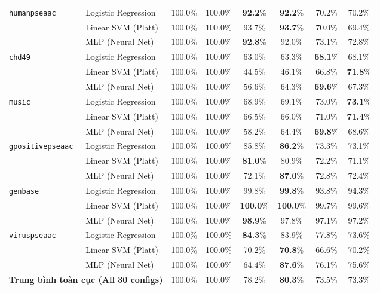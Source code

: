 \documentclass[10pt,a4paper,twoside]{article}
\begin{document}
\begin{table}[H]
{\begin{tabular}{llcccccc}
\midrule
\multirow{3}{*}{\texttt{humanpseaac}} & Logistic Regression & 100.0\% & 100.0\% & \textbf{92.2}\% & \textbf{92.2}\% & 70.2\% & 70.2\% \\
 & Linear SVM (Platt) & 100.0\% & 100.0\% & 93.7\% & \textbf{93.7}\% & 70.0\% & 69.4\% \\
 & MLP (Neural Net) & 100.0\% & 100.0\% & \textbf{92.8}\% & 92.0\% & 73.1\% & 72.8\% \\
\midrule
\multirow{3}{*}{\texttt{chd49}} & Logistic Regression & 100.0\% & 100.0\% & 63.0\% & 63.3\% & \textbf{68.1}\% & 68.1\% \\
 & Linear SVM (Platt) & 100.0\% & 100.0\% & 44.5\% & 46.1\% & 66.8\% & \textbf{71.8}\% \\
 & MLP (Neural Net) & 100.0\% & 100.0\% & 56.6\% & 64.3\% & \textbf{69.6}\% & 67.3\% \\
\midrule
\multirow{3}{*}{\texttt{music}} & Logistic Regression & 100.0\% & 100.0\% & 68.9\% & 69.1\% & 73.0\% & \textbf{73.1}\% \\
 & Linear SVM (Platt) & 100.0\% & 100.0\% & 66.5\% & 66.0\% & 71.0\% & \textbf{71.4}\% \\
 & MLP (Neural Net) & 100.0\% & 100.0\% & 58.2\% & 64.4\% & \textbf{69.8}\% & 68.6\% \\
\midrule
\multirow{3}{*}{\texttt{gpositivepseaac}} & Logistic Regression & 100.0\% & 100.0\% & 85.8\% & \textbf{86.2}\% & 73.3\% & 73.1\% \\
 & Linear SVM (Platt) & 100.0\% & 100.0\% & \textbf{81.0}\% & 80.9\% & 72.2\% & 71.1\% \\
 & MLP (Neural Net) & 100.0\% & 100.0\% & 72.1\% & \textbf{87.0}\% & 72.8\% & 72.4\% \\
\midrule
\multirow{3}{*}{\texttt{genbase}} & Logistic Regression & 100.0\% & 100.0\% & 99.8\% & \textbf{99.8}\% & 93.8\% & 94.3\% \\
 & Linear SVM (Platt) & 100.0\% & 100.0\% & \textbf{100.0}\% & \textbf{100.0}\% & 99.7\% & 99.6\% \\
 & MLP (Neural Net) & 100.0\% & 100.0\% & \textbf{98.9}\% & 97.8\% & 97.1\% & 97.2\% \\
\midrule
\multirow{3}{*}{\texttt{viruspseaac}} & Logistic Regression & 100.0\% & 100.0\% & \textbf{84.3}\% & 83.9\% & 77.8\% & 73.6\% \\
 & Linear SVM (Platt) & 100.0\% & 100.0\% & 70.2\% & \textbf{70.8}\% & 66.6\% & 70.2\% \\
 & MLP (Neural Net) & 100.0\% & 100.0\% & 64.4\% & \textbf{87.6}\% & 76.1\% & 75.6\% \\
\midrule
\multicolumn{2}{l}{\textbf{Trung bình toàn cục (All 30 configs)}} & 100.0\% & 100.0\% & 78.2\% & \textbf{80.3}\% & 73.5\% & 73.3\% \\
\bottomrule
\end{tabular}%
}
\end{table}
\clearpage
\end{document}
